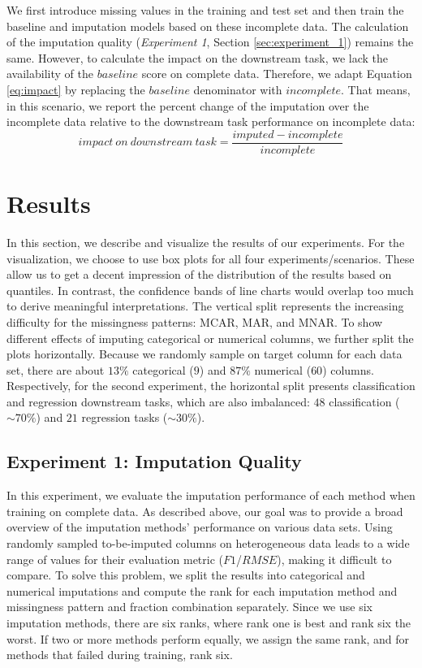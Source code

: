 \documentclass[utf8]{frontiersSCNS} %
\begin{document}
We first introduce missing values in the training and test set and then train the baseline and imputation models based on these incomplete data. The calculation of the imputation quality (\emph{Experiment 1}, Section \ref{sec:experiment_1}) remains the same. However, to calculate the impact on the downstream task, we lack the availability of the $baseline$ score on complete data. Therefore, we adapt Equation \ref{eq:impact} by replacing the $baseline$ denominator with $incomplete$. That means, in this scenario, we report the percent change of the imputation over the incomplete data relative to the downstream task performance on incomplete data:
%
\begin{equation}
	impact\ on \ downstream\ task = \frac{imputed - incomplete}{incomplete}
	\label{eq:impact_scenario2}
\end{equation}
%


\section{Results}
\label{sec:results}

In this section, we describe and visualize the results of our experiments. For the visualization, we choose to use box plots for all four experiments/scenarios. These allow us to get a decent impression of the distribution of the results based on quantiles. In contrast, the confidence bands of line charts would overlap too much to derive meaningful interpretations.  The vertical split represents the increasing difficulty for the missingness patterns: MCAR, MAR, and MNAR. To show different effects of imputing categorical or numerical columns, we further split the plots horizontally.  Because we randomly sample on target column for each data set, there are about $13\%$ categorical ($9$) and $87\%$ numerical ($60$) columns. Respectively, for the second experiment, the horizontal split presents classification and regression downstream tasks, which are also imbalanced: $48$ classification ($\sim70\%$) and $21$ regression tasks ($\sim30\%$).


\subsection{Experiment 1: Imputation Quality}

In this experiment, we evaluate the imputation performance of each method when training on complete data. As described above, our goal was to provide a broad overview of the imputation methods' performance on various data sets. Using randomly sampled to-be-imputed columns on heterogeneous data leads to a wide range of values for their evaluation metric ($F1$/$RMSE$), making it difficult to compare. To solve this problem, we split the results into categorical and numerical imputations and compute the rank for each imputation method and missingness pattern and fraction combination separately. Since we use six imputation methods, there are six ranks, where rank one is best and rank six the worst. If two or more methods perform equally, we assign the same rank, and for methods that failed during training, rank six.
\end{document}
